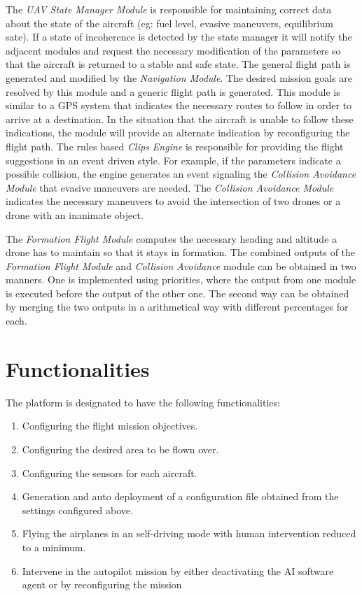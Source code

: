 The \textit{UAV State Manager Module} is responsible for maintaining correct
data about the state of the aircraft (eg: fuel level, evasive maneuvers, equilibrium
sate). If a state of incoherence is detected by the state manager it will notify
the adjacent modules and request the necessary modification of the parameters
so that the aircraft is returned to a stable and safe state. The general flight
path is generated and modified by the \textit{Navigation Module}. The desired
mission goals are resolved by this module and a generic flight path is generated.
This module is similar to a GPS system that indicates the necessary routes 
to follow in order to arrive at a destination. In the situation that the aircraft is 
unable to follow these indications, the module will provide
an alternate indication by reconfiguring the flight path. The 
rules based \textit{Clips Engine} is responsible for providing the flight 
suggestions in an event driven style. For example, if the parameters indicate
a possible collision, the engine generates an event signaling the \textit{
  Collision Avoidance Module} that evasive maneuvers are needed. The \textit{
Collision Avoidance Module} indicates the necessary maneuvers to avoid the
intersection of two drones or a drone with an inanimate object. 

The \textit{Formation Flight Module} computes the necessary heading and altitude
a drone has to maintain so that it stays in formation. The combined outputs 
of the \textit{Formation Flight Module} and \textit{Collision Avoidance} module
can be obtained in two manners. One is implemented using priorities, where the
output from one module is executed before the output of the other one. The second
way can be obtained by merging the two outputs in a arithmetical way with different
percentages for each.

\section{Functionalities}
\label{sec:functionalities}

The platform is designated to have the following functionalities:
\begin{enumerate}
\item Configuring the flight mission objectives.
\item Configuring the desired area to be flown over.
\item Configuring the sensors for each aircraft.
\item Generation and auto deployment of a configuration file obtained from the
settings configured above.
\item Flying the airplanes in an self-driving mode with human intervention reduced
to a minimum.
\item Intervene in the autopilot mission by either deactivating the AI software
agent or by reconfiguring the mission
\end{enumerate}

